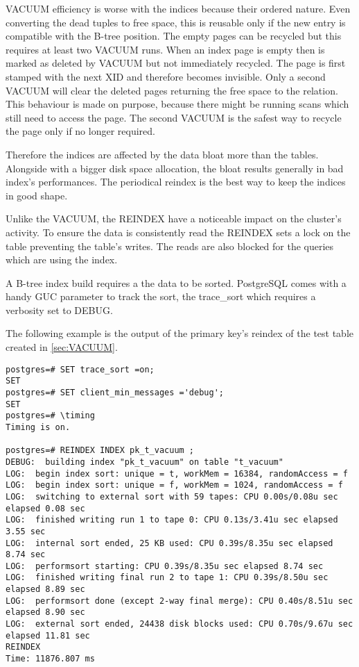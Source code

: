 VACUUM efficiency is worse with the indices because their ordered nature. Even converting the dead 
tuples to free space, this is reusable only if the new entry is compatible with the B-tree position. 
The empty pages can be recycled but this requires at least two VACUUM runs. When an index page is empty 
then is marked as deleted by VACUUM but not immediately recycled. The page is first stamped with the next 
XID and therefore becomes invisible. Only a second VACUUM will clear the deleted pages returning the 
free space to the relation. This behaviour is made on purpose, because there might be running 
scans which still need to access the page. The second VACUUM is the safest way to recycle the page only 
if no longer required.\newline

Therefore the indices are affected by the data bloat more than the tables. Alongside with a bigger disk 
space allocation, the bloat results generally in bad index's performances. The periodical reindex 
is the best way to keep the indices in good shape.\newline

Unlike the VACUUM, the REINDEX have a noticeable impact on the cluster's activity. To ensure the data is 
consistently read the REINDEX sets a lock on the table preventing the table's writes. The reads are also 
blocked for the queries which are using the index.\newline

A B-tree index build requires a the data to be sorted. PostgreSQL comes with a handy GUC parameter to track 
the sort, the trace\_sort which requires a verbosity set to DEBUG.

The following example is the output of the primary key's reindex of the test table created in 
\ref{sec:VACUUM}. 


\begin{lstlisting}[style=pgsql]
postgres=# SET trace_sort =on;
SET
postgres=# SET client_min_messages ='debug';
SET
postgres=# \timing
Timing is on.

postgres=# REINDEX INDEX pk_t_vacuum ;
DEBUG:  building index "pk_t_vacuum" on table "t_vacuum"
LOG:  begin index sort: unique = t, workMem = 16384, randomAccess = f
LOG:  begin index sort: unique = f, workMem = 1024, randomAccess = f
LOG:  switching to external sort with 59 tapes: CPU 0.00s/0.08u sec elapsed 0.08 sec
LOG:  finished writing run 1 to tape 0: CPU 0.13s/3.41u sec elapsed 3.55 sec
LOG:  internal sort ended, 25 KB used: CPU 0.39s/8.35u sec elapsed 8.74 sec
LOG:  performsort starting: CPU 0.39s/8.35u sec elapsed 8.74 sec
LOG:  finished writing final run 2 to tape 1: CPU 0.39s/8.50u sec elapsed 8.89 sec
LOG:  performsort done (except 2-way final merge): CPU 0.40s/8.51u sec elapsed 8.90 sec
LOG:  external sort ended, 24438 disk blocks used: CPU 0.70s/9.67u sec elapsed 11.81 sec
REINDEX
Time: 11876.807 ms

\end{lstlisting}

